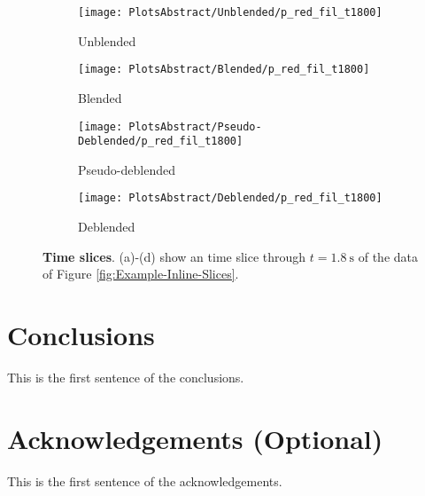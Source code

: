 \documentclass{madrid15WS}
\begin{document}
\begin{figure}[h!]
	\centering
	\begin{subfigure}[t]{0.4\textwidth}
		\centering
		\texttt{[image: PlotsAbstract/Unblended/p\_red\_fil\_t1800]}
		\caption{Unblended}
		\label{fig:Example-Unblendedt}
	\end{subfigure}
	\centering
	\begin{subfigure}[t]{0.4\textwidth}
		\centering
		\texttt{[image: PlotsAbstract/Blended/p\_red\_fil\_t1800]}
		\caption{Blended}
		\label{fig:Example-Blendedt}
	\end{subfigure}
	
	\centering
	\begin{subfigure}[t]{0.4\textwidth}
		\centering
		\texttt{[image: PlotsAbstract/Pseudo-Deblended/p\_red\_fil\_t1800]} %
		\caption{Pseudo-deblended}
		\label{fig:Example-Pseudot}
	\end{subfigure}
	\centering
	\begin{subfigure}[t]{0.4\textwidth}
		\centering
		\texttt{[image: PlotsAbstract/Deblended/p\_red\_fil\_t1800]} %
		\caption{Deblended}
		\label{fig:Example-Deblendedt}
	\end{subfigure}
		
	\caption{\textbf{Time slices}. (a)-(d) show an time slice through $t = \SI{1.8}{\second}$ of the data of Figure \ref{fig:Example-Inline-Slices}.}
	\label{fig:Example-Time-Slices}

\end{figure}



\section{Conclusions}

This is the first sentence of the conclusions.

\section{Acknowledgements (Optional)}

This is the first sentence of the acknowledgements.

%
%
% 


\end{document}
